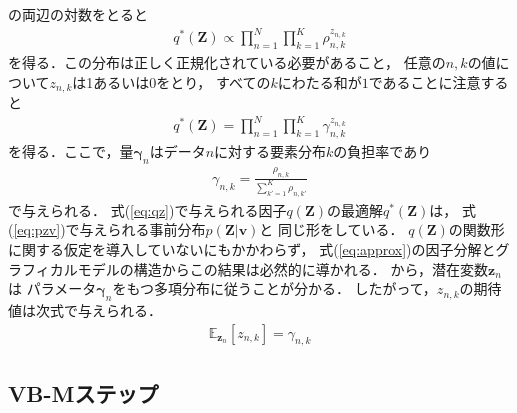 の両辺の対数をとると
\begin{eqnarray}
 q^*(\bm{Z}) 
 \propto
 \prod_{n=1}^{N}\prod_{k=1}^{K} \rho_{n,k}^{z_{n,k}}
\end{eqnarray}
を得る．この分布は正しく正規化されている必要があること，
任意の$n,k$の値について$z_{n,k}$は1あるいは0をとり，
すべての$k$にわたる和が$1$であることに注意すると
\begin{eqnarray}
 q^*(\bm{Z}) 
 =
 \prod_{n=1}^{N}\prod_{k=1}^{K}
 \gamma_{n,k}^{z_{n,k}} 
 \label{eq:qz}
\end{eqnarray}
を得る．ここで，量$\bm\gamma_{n}$はデータ$n$に対する要素分布$k$の負担率であり
\begin{eqnarray}
 \gamma_{n,k} = \frac{\rho_{n,k}}{\sum_{k'=1}^{K}\rho_{n,k'}}
\end{eqnarray}
で与えられる．
式(\ref{eq:qz})で与えられる因子$q(\bm{Z})$の最適解$q^*(\bm{Z})$は，
式(\ref{eq:pzv})で与えられる事前分布$p(\bm{Z}|\bm{v})$と
同じ形をしている．
$q(\bm{Z})$の関数形に関する仮定を導入していないにもかかわらず，
式(\ref{eq:approx})の因子分解とグラフィカルモデルの構造からこの結果は必然的に導かれる．
から，潜在変数$\bm{z}_{n}$は
パラメータ$\bm\gamma_{n}$をもつ多項分布に従うことが分かる．
したがって，$z_{n,k}$の期待値は次式で与えられる．
\begin{eqnarray}
 \mathbb{E}_{\bm{z}_{n}}[z_{n,k}] = \gamma_{n,k} 
  \label{eq:ez}
\end{eqnarray}

\subsection{VB-Mステップ}\label{sec:vb-m}

